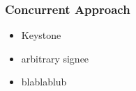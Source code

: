 \begin{frame}
	\frametitle{Concurrent Approach}
	
	\begin{itemize}
		\setlength\itemsep{1em}
		\item Keystone
		\item arbitrary signee
		\item blablablub
	\end{itemize}
\end{frame}